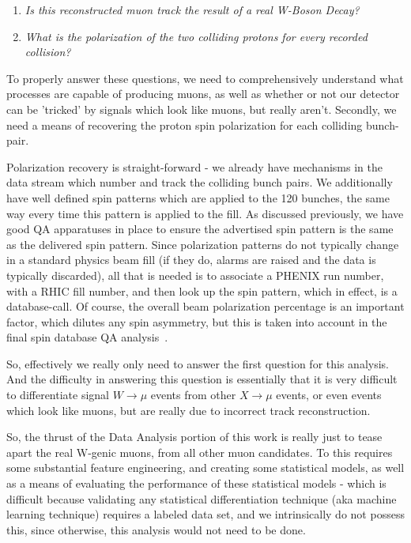 \begin{enumerate}
  \item \textit{Is this reconstructed muon track the result of a real W-Boson Decay?}
  \item \textit{What is the polarization of the two colliding protons for every recorded collision?}
\end{enumerate}

To properly answer these questions, we need to comprehensively understand what
processes are capable of producing muons, as well as whether or not our detector
can be 'tricked' by signals which look like muons, but really aren't. Secondly,
we need a means of recovering the proton spin polarization for each colliding
bunch-pair.

Polarization recovery is straight-forward - we already have mechanisms in the
data stream which number and track the colliding bunch pairs. We additionally
have well defined spin patterns which are applied to the 120 bunches, the same
way every time this pattern is applied to the fill. As discussed previously, we
have good QA apparatuses in place to ensure the advertised spin pattern is the
same as the delivered spin pattern. Since polarization patterns do not typically
change in a standard physics beam fill (if they do, alarms are raised and the
data is typically discarded), all that is needed is to associate a PHENIX run
number, with a RHIC fill number, and then look up the spin pattern, which in
effect, is a database-call. Of course, the overall beam polarization percentage
is an important factor, which dilutes any spin asymmetry, but this is taken into
account in the final spin database QA analysis~\cite{Kim2014}.

So, effectively we really only need to answer the first question for this
analysis. And the difficulty in answering this question is essentially that it
is very difficult to differentiate signal $W\rightarrow\mu$ events from other
$X\rightarrow\mu$ events, or even events which look like muons, but are really
due to incorrect track reconstruction.

So, the thrust of the Data Analysis portion of this work is really just to tease
apart the real W-genic muons, from all other muon candidates. To this requires
some substantial feature engineering, and creating some statistical models, as
well as a means of evaluating the performance of these statistical models -
which is difficult because validating any statistical differentiation technique
(aka machine learning technique) requires a labeled data set, and we
intrinsically do not possess this, since otherwise, this analysis would not need
to be done.

